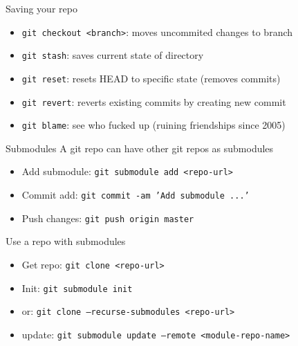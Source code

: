 \begin{frame}{Saving your repo}
	\begin{itemize}
		\item \texttt{git checkout <branch>}: moves uncommited changes to branch
		\item \texttt{git stash}: saves current state of directory
		\item \texttt{git reset}: resets HEAD to specific state (removes commits)
		\item \texttt{git revert}: reverts existing commits by creating new commit
		\item \texttt{git blame}: see who fucked up (ruining friendships since 2005)
	\end{itemize}
\end{frame}
\begin{frame}{Submodules}
	A git repo can have other git repos as submodules
	\begin{itemize}
		\item Add submodule: \texttt{git submodule add <repo-url>}
		\item Commit add: \texttt{git commit -am 'Add submodule ...'}
		\item Push changes: \texttt{git push origin master}
	\end{itemize}
	Use a repo with submodules
	\begin{itemize}
		\item Get repo: \texttt{git clone <repo-url>}
		\item Init: \texttt{git submodule init}
		\item or: \texttt{git clone --recurse-submodules <repo-url>}
		\item update: \texttt{git submodule update --remote <module-repo-name>}
	\end{itemize}
\end{frame}
